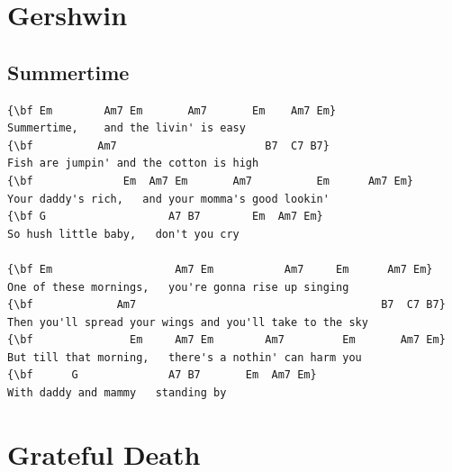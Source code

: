 \documentclass[a4paper]{article}
\begin{document}
\section{Gershwin}
\subsection{Summertime}
\begin{Verbatim}[commandchars=\\\{\}]
{\bf Em        Am7 Em       Am7       Em    Am7 Em}
Summertime,    and the livin' is easy
{\bf          Am7                       B7  C7 B7}
Fish are jumpin' and the cotton is high
{\bf              Em  Am7 Em       Am7          Em      Am7 Em}
Your daddy's rich,   and your momma's good lookin'
{\bf G                   A7 B7        Em  Am7 Em}
So hush little baby,   don't you cry

{\bf Em                   Am7 Em           Am7     Em      Am7 Em}
One of these mornings,   you're gonna rise up singing
{\bf             Am7                                      B7  C7 B7}
Then you'll spread your wings and you'll take to the sky
{\bf               Em     Am7 Em        Am7         Em       Am7 Em}
But till that morning,   there's a nothin' can harm you
{\bf      G              A7 B7       Em  Am7 Em}
With daddy and mammy   standing by

\end{Verbatim}
\newpage
\section{Grateful Death}
\end{document}
